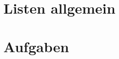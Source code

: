 \documentclass{lehramt-informatik}
\begin{document}

\chapter{Listen allgemein}


\chapter{Aufgaben}

\literatur
\end{document}
